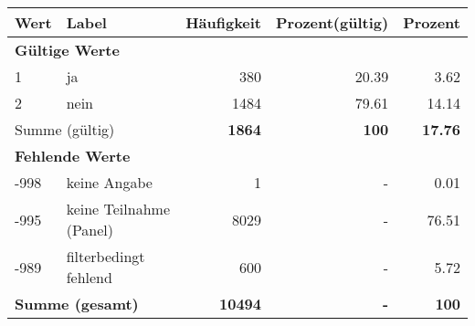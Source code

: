      \begin{longtable}{lXrrr}
     \toprule
     \textbf{Wert} & \textbf{Label} & \textbf{Häufigkeit} & \textbf{Prozent(gültig)} & \textbf{Prozent} \\
     \endhead
     \midrule
     \multicolumn{5}{l}{\textbf{Gültige Werte}}\\

     1 &
     \multicolumn{1}{X}{ ja   } &


       \num{380} &
       \num[round-mode=places,round-precision=2]{20.39} &
         \num[round-mode=places,round-precision=2]{3.62} \\

     2 &
     \multicolumn{1}{X}{ nein   } &


       \num{1484} &
       \num[round-mode=places,round-precision=2]{79.61} &
         \num[round-mode=places,round-precision=2]{14.14} \\
     \midrule
     \multicolumn{2}{l}{Summe (gültig)} &
       \textbf{\num{1864}} &
     \textbf{\num{100}} &
       \textbf{\num[round-mode=places,round-precision=2]{17.76}} \\
     \multicolumn{5}{l}{\textbf{Fehlende Werte}}\\
       -998 &
       keine Angabe &
         \num{1} &
        - &
         \num[round-mode=places,round-precision=2]{0.01} \\
       -995 &
       keine Teilnahme (Panel) &
         \num{8029} &
        - &
         \num[round-mode=places,round-precision=2]{76.51} \\
       -989 &
       filterbedingt fehlend &
         \num{600} &
        - &
         \num[round-mode=places,round-precision=2]{5.72} \\
     \midrule
     \multicolumn{2}{l}{\textbf{Summe (gesamt)}} &
          \textbf{\num{10494}} &
        \textbf{-} &
        \textbf{\num{100}} \\
     \bottomrule
     \end{longtable}
     
